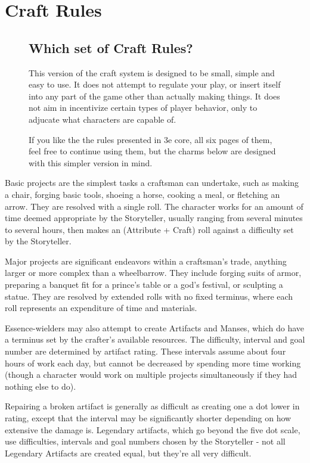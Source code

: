 \documentclass[oneside]{book}
\newlength{\sidewidth}
\newenvironment{sidebarPartial}[2][]{%
   \def\imgcmd{\texttt{[image: \#2]}}%
   \begin{lrbox}{\mysavebox}%
   \begin{minipage}%
}{%
   \end{minipage}
   \end{lrbox}%
   \sbox\mysavebox{\fbox{\usebox\mysavebox}}%
   \mbox{\rlap{\raisebox{-\dp\mysavebox}{\imgcmd}}\usebox\mysavebox}%
}
\newenvironment{sidebar}[1]{%
  \begin{figure}[tb]%
  \begin{sidebarPartial}{resources/bg-sidebar.jpg}{\textwidth}%
  \vspace{6pt}
  \subsection*{#1}\vspace{6pt}%
  \centering
  \begin{minipage}{\sidewidth}
}
{
  \end{minipage}
  \vspace{6pt}
  \end{sidebarPartial}
  \end{figure}
}
\begin{document}
\section*{Craft Rules}
\begin{multicols}{2}
\begin{sidebar}{Which set of Craft Rules?}
  This version of the craft system is designed to be small, simple and easy to use. It does not attempt to regulate your play, or insert itself into any part of the game other than actually making things. It does not aim in incentivize certain types of player behavior, only to adjucate what characters are capable of.

  \par \vspace{6pt} If you like the the rules presented in 3e core, all six pages of them, feel free to continue using them, but the charms below are designed with this simpler version in mind.
\end{sidebar}

\par Basic projects are the simplest tasks a craftsman can undertake, such as making a chair, forging basic tools, shoeing a horse, cooking a meal, or fletching an arrow. They are resolved with a single roll. The character works for an amount of time deemed appropriate by the Storyteller, usually ranging from several minutes to several hours, then makes an (Attribute + Craft) roll against a difficulty set by the Storyteller.

  \par Major projects are significant endeavors within a craftsman's trade, anything larger or more complex than a wheelbarrow. They include forging suits of armor, preparing a banquet fit for a prince's table or a god's festival, or sculpting a statue. They are resolved by extended rolls with no fixed terminus, where each roll represents an expenditure of time and materials.

  \par Essence-wielders may also attempt to create Artifacts and Manses, which do have a terminus set by the crafter's available resources. The difficulty, interval and goal number are determined by artifact rating. These intervals assume about four hours of work each day, but cannot be decreased by spending more time working (though a character would work on multiple projects simultaneously if they had nothing else to do).

  \par Repairing a broken artifact is generally as difficult as creating one a dot lower in rating, except that the interval may be significantly shorter depending on how extensive the damage is. Legendary artifacts, which go beyond the five dot scale, use difficulties, intervals and goal numbers chosen by the Storyteller - not all Legendary Artifacts are created equal, but they're all very difficult.


\end{multicols}
\end{document}
